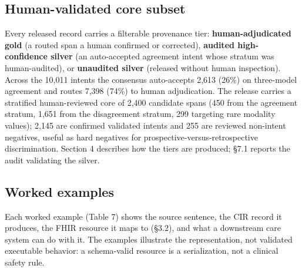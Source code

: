 \subsection{Human-validated core subset}\label{human-validated-core-subset}

Every released record carries a filterable provenance tier: \textbf{human-adjudicated gold} (a routed span a human confirmed or corrected), \textbf{audited high-confidence silver} (an auto-accepted agreement intent whose stratum was human-audited), or \textbf{unaudited silver} (released without human inspection). Across the 10,011 intents the consensus auto-accepts 2,613 (26\%) on three-model agreement and routes 7,398 (74\%) to human adjudication. The release carries a stratified human-reviewed core of 2,400 candidate spans (450 from the agreement stratum, 1,651 from the disagreement stratum, 299 targeting rare modality values); 2,145 are confirmed validated intents and 255 are reviewed non-intent negatives, useful as hard negatives for prospective-versus-retrospective discrimination. Section 4 describes how the tiers are produced; §7.1 reports the audit validating the silver.

\subsection{Worked examples}\label{worked-examples}

Each worked example (Table 7) shows the source sentence, the CIR record it produces, the FHIR resource it maps to (§3.2), and what a downstream care system can do with it. The examples illustrate the representation, not validated executable behavior: a schema-valid resource is a serialization, not a clinical safety rule.

